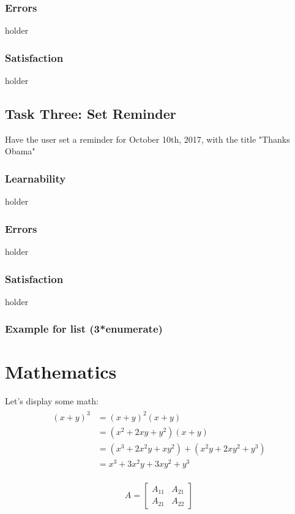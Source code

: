 \documentclass[paper=a4, fontsize=11pt]{scrartcl}	%
\numberwithin{equation}{section}															%
\numberwithin{figure}{section}																%
\numberwithin{table}{section}																%
\begin{document}
\subsubsection{Errors}
holder

\subsubsection{Satisfaction}
holder


\subsection{Task Three: Set Reminder}
Have the user set  a reminder for October 10th, 2017, with the title "Thanks Obama"

\subsubsection{Learnability}
holder


\subsubsection{Errors}
holder

\subsubsection{Satisfaction}
holder









\subsubsection{Example for list (3*enumerate)}




\section{Mathematics}
Let's display some math:
\begin{align} 
	\begin{split}
	(x+y)^3 	&= (x+y)^2(x+y)\\
					&=(x^2+2xy+y^2)(x+y)\\
					&=(x^3+2x^2y+xy^2) + (x^2y+2xy^2+y^3)\\
					&=x^3+3x^2y+3xy^2+y^3
	\end{split}					
\end{align}

\begin{align}
	A = 
	\begin{bmatrix}
	A_{11} & A_{21} \\
  	A_{21} & A_{22}
	\end{bmatrix}
\end{align}
\end{document}
